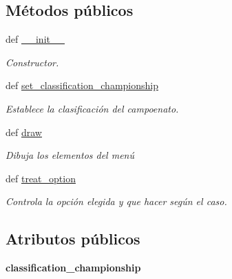 \subsection*{\-Métodos públicos}
\begin{DoxyCompactItemize}
\item 
def \hyperlink{classengine_1_1classificationmenu_1_1ChampionShipMenu_ab6a6f2a446ee26f87fc9a7a4f64ef26c}{\-\_\-\-\_\-init\-\_\-\-\_\-}
\begin{DoxyCompactList}\small\item\em \-Constructor. \end{DoxyCompactList}\item 
def \hyperlink{classengine_1_1classificationmenu_1_1ChampionShipMenu_af3cc2ea19ebc3428b9ec7b270d3ff08d}{set\-\_\-classification\-\_\-championship}
\begin{DoxyCompactList}\small\item\em \-Establece la clasificación del campoenato. \end{DoxyCompactList}\item 
def \hyperlink{classengine_1_1classificationmenu_1_1ChampionShipMenu_a95851e106380aebfd46863fccbb1f273}{draw}
\begin{DoxyCompactList}\small\item\em \-Dibuja los elementos del menú \end{DoxyCompactList}\item 
\hypertarget{classengine_1_1classificationmenu_1_1ChampionShipMenu_a5a2ef3157e0bbbf2b2d22f13d6a3d751}{
def \hyperlink{classengine_1_1classificationmenu_1_1ChampionShipMenu_a5a2ef3157e0bbbf2b2d22f13d6a3d751}{treat\-\_\-option}}
\label{classengine_1_1classificationmenu_1_1ChampionShipMenu_a5a2ef3157e0bbbf2b2d22f13d6a3d751}

\begin{DoxyCompactList}\small\item\em \-Controla la opción elegida y que hacer según el caso. \end{DoxyCompactList}\end{DoxyCompactItemize}
\subsection*{\-Atributos públicos}
\begin{DoxyCompactItemize}
\item 
\hypertarget{classengine_1_1classificationmenu_1_1ChampionShipMenu_aecc6ca4a4da23209601bce1bf0d2a421}{
{\bfseries classification\-\_\-championship}}
\label{classengine_1_1classificationmenu_1_1ChampionShipMenu_aecc6ca4a4da23209601bce1bf0d2a421}

\end{DoxyCompactItemize}


